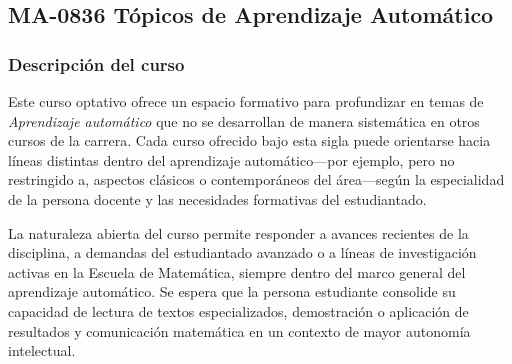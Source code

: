 \newpage
\subsection*{MA-0836 Tópicos de Aprendizaje Automático}

\hypertarget{MA0836}{}
\begin{refsection}
\begin{table}[H]
\end{table}

\subsubsection*{Descripción del curso}

Este curso optativo ofrece un espacio formativo para profundizar en temas de \emph{Aprendizaje automático} que no se desarrollan de manera sistemática en otros cursos de la carrera. Cada curso ofrecido bajo esta sigla puede orientarse hacia líneas distintas dentro del aprendizaje automático---por ejemplo, pero no restringido a, aspectos clásicos o contemporáneos del área---según la especialidad de la persona docente y las necesidades formativas del estudiantado.

La naturaleza abierta del curso permite responder a avances recientes de la disciplina, a demandas del estudiantado avanzado o a líneas de investigación activas en la Escuela de Matemática, siempre dentro del marco general del aprendizaje automático. Se espera que la persona estudiante consolide su capacidad de lectura de textos especializados, demostración o aplicación de resultados y comunicación matemática en un contexto de mayor autonomía intelectual.


\end{refsection}
